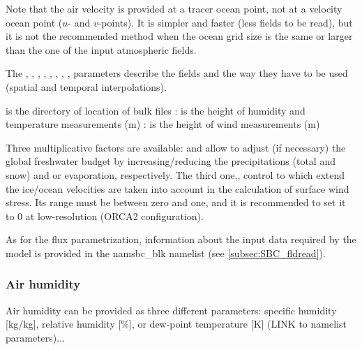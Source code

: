 \documentclass[../main/NEMO_manual]{subfiles}
\begin{document}
Note that the air velocity is provided at a tracer ocean point, not at a velocity ocean point ($u$- and $v$-points).
It is simpler and faster (less fields to be read), but it is not the recommended method when
the ocean grid size is the same or larger than the one of the input atmospheric fields.

The , , , , , , ,
,  parameters describe the fields and the way they have to be used
(spatial and temporal interpolations).

 is the directory of location of bulk files
: is the height of humidity and temperature measurements (m)
: is the height of wind measurements (m)

Three multiplicative factors are available:
 and  allow to adjust (if necessary) the global freshwater budget by
increasing/reducing the precipitations (total and snow) and or evaporation, respectively.
The third one,, control to which extend the ice/ocean velocities are taken into account in
the calculation of surface wind stress.
Its range must be between zero and one, and it is recommended to set it to 0 at low-resolution (ORCA2 configuration).

As for the flux parametrization, information about the input data required by the model is provided in
the namsbc\_blk namelist (see \autoref{subsec:SBC_fldread}).

\subsubsection{Air humidity}

Air humidity can be provided as three different parameters: specific humidity
[kg/kg], relative humidity [\%], or dew-point temperature [K] (LINK to namelist
parameters)...

\end{document}
